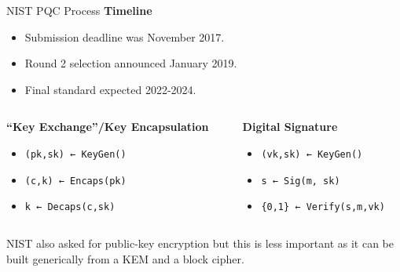 \documentclass[xcolor=table,10pt,aspectratio=169]{beamer}
\begin{document}
\begin{frame}[label={sec:orgc37841d},fragile]{NIST PQC {\color{lightgray}{Competition} }Process}
 \textbf{Timeline}

\begin{itemize}
\item Submission deadline was November 2017.
\item Round 2 selection announced January 2019.
\item Final standard expected 2022-2024.
\end{itemize}

\vspace{1em}

\begin{columns}[t]
\begin{column}{0.5\columnwidth}
\textbf{“Key Exchange”/Key Encapsulation}

\begin{itemize}
\item \texttt{(pk,sk) ← KeyGen()}
\item \texttt{(c,k) ← Encaps(pk)}
\item \texttt{k ← Decaps(c,sk)}
\end{itemize}
\end{column}

\begin{column}{0.5\columnwidth}
\textbf{Digital Signature}

\begin{itemize}
\item \texttt{(vk,sk)  ← KeyGen()}
\item \texttt{s  ← Sig(m, sk)}
\item \texttt{\{0,1\}  ← Verify(s,m,vk)}
\end{itemize}
\end{column}
\end{columns}

\vspace{1em}
\pause

NIST also asked for public-key encryption but this is less important as it can be built generically from a KEM and a block cipher.
\end{frame}
\end{document}
